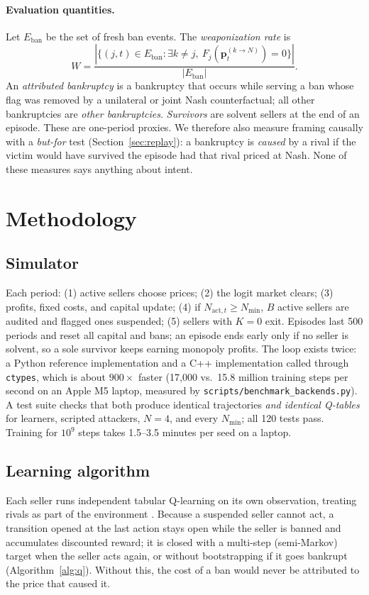 \documentclass{article}
\newcommand{\Nact}{N_{\mathrm{act},t}}
\newcommand{\Nmin}{N_{\min}}
\begin{document}
\paragraph{Evaluation quantities.} Let $E_{\mathrm{ban}}$ be the set of fresh ban events. The \emph{weaponization rate} is
\begin{equation}
W=\frac{|\{(j,t)\in E_{\mathrm{ban}}:\exists k\neq j,\ F_j(\mathbf p_t^{(k\to N)})=0\}|}{|E_{\mathrm{ban}}|}.
\end{equation}
An \emph{attributed bankruptcy} is a bankruptcy that occurs while serving a ban whose flag was removed by a unilateral or joint Nash counterfactual; all other bankruptcies are \emph{other bankruptcies}. \emph{Survivors} are solvent sellers at the end of an episode. These are one-period proxies. We therefore also measure framing causally with a \emph{but-for} test (Section~\ref{sec:replay}): a bankruptcy is \emph{caused} by a rival if the victim would have survived the episode had that rival priced at Nash. None of these measures says anything about intent.

\section{Methodology}
\label{sec:method}

\subsection{Simulator}
Each period: (1) active sellers choose prices; (2) the logit market clears; (3) profits, fixed costs, and capital update; (4) if $\Nact\ge\Nmin$, $B$ active sellers are audited and flagged ones suspended; (5) sellers with $K=0$ exit. Episodes last 500 periods and reset all capital and bans; an episode ends early only if no seller is solvent, so a sole survivor keeps earning monopoly profits. The loop exists twice: a Python reference implementation and a C++ implementation called through \texttt{ctypes}, which is about $900\times$ faster (17{,}000 vs.\ 15.8 million training steps per second on an Apple M5 laptop, measured by \texttt{scripts/benchmark\_backends.py}). A test suite checks that both produce identical trajectories \emph{and identical Q-tables} for learners, scripted attackers, $N=4$, and every $\Nmin$; all 120 tests pass. Training for $10^9$ steps takes 1.5--3.5 minutes per seed on a laptop.

\subsection{Learning algorithm}
Each seller runs independent tabular Q-learning \citep{watkins1992} on its own observation, treating rivals as part of the environment \citep{tan1993}. Because a suspended seller cannot act, a transition opened at the last action stays open while the seller is banned and accumulates discounted reward; it is closed with a multi-step (semi-Markov) target when the seller acts again, or without bootstrapping if it goes bankrupt (Algorithm~\ref{alg:q}). Without this, the cost of a ban would never be attributed to the price that caused it.
\end{document}
